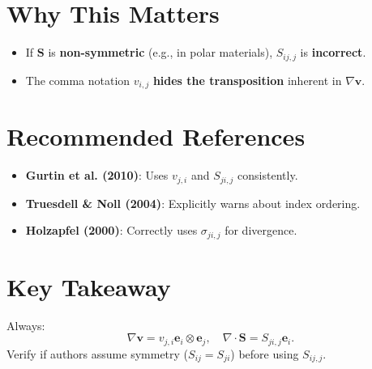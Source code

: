 \documentclass{article}
\begin{document}
\section*{Why This Matters}
\begin{itemize}
    \item If \(\mathbf{S}\) is \textbf{non-symmetric} (e.g., in polar materials), \(S_{ij,j}\) is \textbf{incorrect}.
    \item The comma notation \(v_{i,j}\) \textbf{hides the transposition} inherent in \(\nabla \mathbf{v}\).
\end{itemize}

\section*{Recommended References}
\begin{itemize}
    \item \textbf{Gurtin et al. (2010)}: Uses \(v_{j,i}\) and \(S_{ji,j}\) consistently.
    \item \textbf{Truesdell \& Noll (2004)}: Explicitly warns about index ordering.
    \item \textbf{Holzapfel (2000)}: Correctly uses \(\sigma_{ji,j}\) for divergence.
\end{itemize}

\section*{Key Takeaway}
Always:
\[
\nabla \mathbf{v} = v_{j,i} \mathbf{e}_i \otimes \mathbf{e}_j, \quad \nabla \cdot \mathbf{S} = S_{ji,j} \mathbf{e}_i.
\]
Verify if authors assume symmetry (\(S_{ij} = S_{ji}\)) before using \(S_{ij,j}\).
\end{document}
